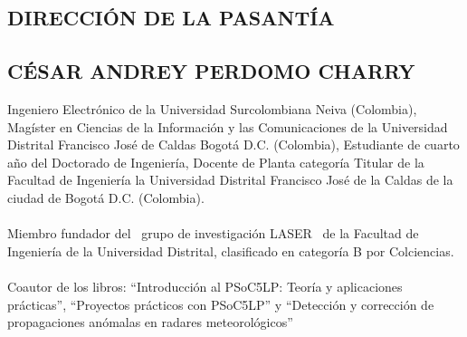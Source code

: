
\begin{center}
\section{DIRECCI\'ON DE LA PASANT\'IA}
\end{center}

\subsection{C\'ESAR ANDREY PERDOMO CHARRY}

\noindent Ingeniero Electr\'onico de la Universidad Surcolombiana Neiva (Colombia), Mag\'ister en Ciencias de la Informaci\'on y las Comunicaciones de la Universidad Distrital Francisco Jos\'e de Caldas Bogotá D.C. (Colombia), Estudiante de cuarto año del Doctorado de Ingenier\'ia, Docente de Planta categor\'ia Titular de la Facultad de Ingenier\'ia la Universidad Distrital Francisco Jos\'e de la Caldas de la ciudad de Bogot\'a D.C. (Colombia).
\\
\\
\noindent Miembro fundador del  grupo de investigaci\'on LASER  de la Facultad de Ingenier\'ia de la Universidad Distrital, clasificado en categor\'ia B por Colciencias.
\\
\\
\noindent Coautor de los libros: ``Introducci\'on al PSoC5LP: Teor\'ia y aplicaciones pr\'acticas'', ``Proyectos pr\'acticos con PSoC5LP'' y ``Detecci\'on y correcci\'on de propagaciones an\'omalas en radares meteorol\'ogicos''